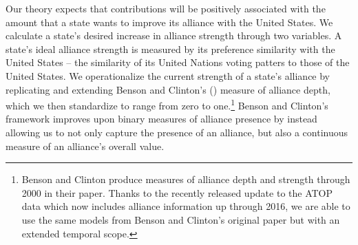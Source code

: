 \documentclass[12pt,letterpaper]{article}
\begin{document}
		Our theory expects that contributions will be positively associated with the amount that a state wants to improve its alliance with the United States. We calculate a state's desired increase in alliance strength through two variables. A state's ideal alliance strength is measured by its preference similarity with the United States -- the similarity of its United Nations voting patters to those of the United States. We operationalize the current strength of a state's alliance by replicating and extending Benson and Clinton's (\citeyear{benson_assessingvariationformal_2016}) measure of alliance depth, which we then standardize to range from zero to one.\footnote{Benson and Clinton produce measures of alliance depth and strength through 2000 in their paper. Thanks to the recently released update to the ATOP data \citep{leeds_alliancetreatyobligations_2002} which now includes alliance information up through 2016, we are able to use the same models from Benson and Clinton's original paper  but with an extended temporal scope.} Benson and Clinton's framework improves upon binary measures of alliance presence by instead allowing us to not only capture the presence of an alliance, but also a continuous measure of an alliance's overall value.

		
\end{document}
